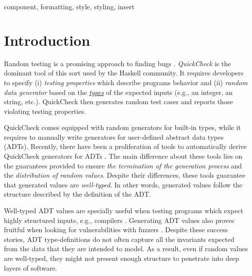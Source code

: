 \documentclass[conference, fleqn]{IEEEtran}
\newcommand{\quickcheck}{\emph{QuickCheck}\xspace}
\begin{document}
\begin{IEEEkeywords}
component, formatting, style, styling, insert
\end{IEEEkeywords}


\section{Introduction}

Random testing is a promising approach to finding bugs
\cite{HughesNSA16,HughesPAN16,ArtsHNS15}.
%
\quickcheck \cite{ClaessenH00} is the dominant tool of this sort used by the
Haskell community.
%
It requires developers to specify (i) \emph{testing properties} which describe
programs behavior and (ii) \emph{random data generator} based on the
\underline{\emph{types}} of the expected inputs (e.g., an integer, an string,
etc.). %
%
QuickCheck then generates random test cases and reports those violating testing
properties.
%

QuickCheck comes equipped with random generators for built-in types, while it
requires to manually write generators for user-defined abstract data types
(ADTs).
%
Recently, there have been a proliferation of tools to automatically derive
QuickCheck generators for ADTs
\cite{mitchell2007,RuncimanNL08,DuregardJW12,grieco2017,DBLP:conf/haskell/MistaRH18}.
%
The main difference about these tools lies on the guarantees provided to ensure
\emph{the termination of the generation process} and the \emph{distribution of
  random values}.
%
Despite their differences, these tools guarantee that generated values are
\emph{well-typed}.
%
In other words, generated values follow the structure described by the
definition of the ADT.
%

Well-typed ADT values are specially useful when testing programs which expect
highly structured inputs, e.g., compilers \cite{Palka11,MidtgaardJKNN17}.
%
Generating ADT values also proves fruitful when looking for vulnerabilities with
fuzzers \cite{GriecoCB16,grieco2017}.
%
%
Despite these success stories, ADT type-definitions do not often capture all the
invariants expected from the data that they are intended to model.
%
As a result, even if random values are well-typed, they might not present enough
structure to penetrate into deep layers of software.
\end{document}
